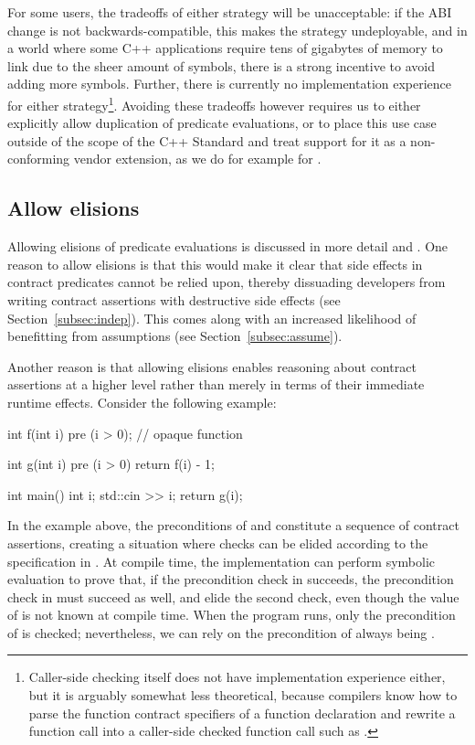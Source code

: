 For some users, the tradeoffs of either strategy will be unacceptable: if the ABI change is not backwards-compatible, this makes the strategy undeployable, and in a world where some C++ applications require tens of gigabytes of memory to link due to the sheer amount of symbols, there is a strong incentive to avoid adding more symbols. Further, there is currently no implementation experience for either strategy\footnote{Caller-side checking itself does not have implementation experience either, but it is arguably somewhat less theoretical, because compilers know how to parse the function contract specifiers of a function declaration and rewrite a function call  into a caller-side checked function call such as \mbox{}.}. Avoiding these tradeoffs however requires us to either explicitly allow duplication of predicate evaluations, or to place this use case outside of the scope of the C++ Standard and treat support for it as a non-conforming vendor extension, as we do for example for .

\subsection{Allow elisions}
\label{subsec:elisions}

Allowing elisions of predicate evaluations is discussed in more detail \cite{P1670R0} and \cite{P2751R1}. One reason to allow elisions is that this would make it clear that side effects in contract predicates cannot be relied upon, thereby dissuading developers from writing contract assertions with destructive side effects (see Section~\ref{subsec:indep}). This comes along with an increased likelihood of benefitting from assumptions (see Section~\ref{subsec:assume}). 

Another reason is that allowing elisions enables reasoning about contract assertions at a higher level rather than merely in terms of their immediate runtime effects. Consider the following example:
\begin{codeblock}
int f(int i)
  pre (i > 0);  // opaque function
  
int g(int i)
  pre (i > 0) {
  return f(i) - 1;
}

int main() {
  int i;
  std::cin >> i;
  return g(i);
}
\end{codeblock}
In the example above, the preconditions of  and  constitute a sequence of contract assertions, creating a situation where checks can be elided according to the specification in \cite{P2900R6}. At compile time, the implementation can perform symbolic evaluation to prove that, if the precondition check in  succeeds, the precondition check in  must succeed as well, and elide the second check, even though the value of  is not known at compile time. When the program runs, only the precondition of  is checked; nevertheless, we can rely on the precondition of  always being .

